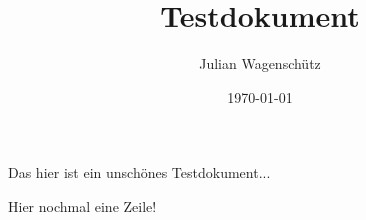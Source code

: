\documentclass[12pt]{scrartcl}
\title{Testdokument}
\author{Julian Wagenschütz}
\date{\today}
\begin{document}
\maketitle

Das hier ist ein unschönes Testdokument...

Hier nochmal eine Zeile!
\end{document}
